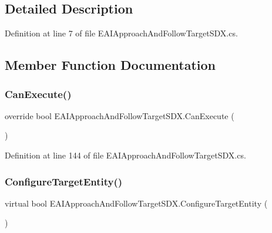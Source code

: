 \subsection{Detailed Description}


Definition at line 7 of file E\+A\+I\+Approach\+And\+Follow\+Target\+S\+D\+X.\+cs.



\subsection{Member Function Documentation}
\mbox{\label{class_e_a_i_approach_and_follow_target_s_d_x_a4bd593810e37cd0adef6eef1575f44a9}} 
\subsubsection{\texorpdfstring{CanExecute()}{CanExecute()}}
{\footnotesize\ttfamily override bool E\+A\+I\+Approach\+And\+Follow\+Target\+S\+D\+X.\+Can\+Execute (\begin{DoxyParamCaption}{ }\end{DoxyParamCaption})}



Definition at line 144 of file E\+A\+I\+Approach\+And\+Follow\+Target\+S\+D\+X.\+cs.

\mbox{\label{class_e_a_i_approach_and_follow_target_s_d_x_ac0dde8a72e020fd849a86495b47c707d}} 
\subsubsection{\texorpdfstring{ConfigureTargetEntity()}{ConfigureTargetEntity()}}
{\footnotesize\ttfamily virtual bool E\+A\+I\+Approach\+And\+Follow\+Target\+S\+D\+X.\+Configure\+Target\+Entity (\begin{DoxyParamCaption}{ }\end{DoxyParamCaption})\hspace{0.3cm}{\ttfamily [virtual]}}



